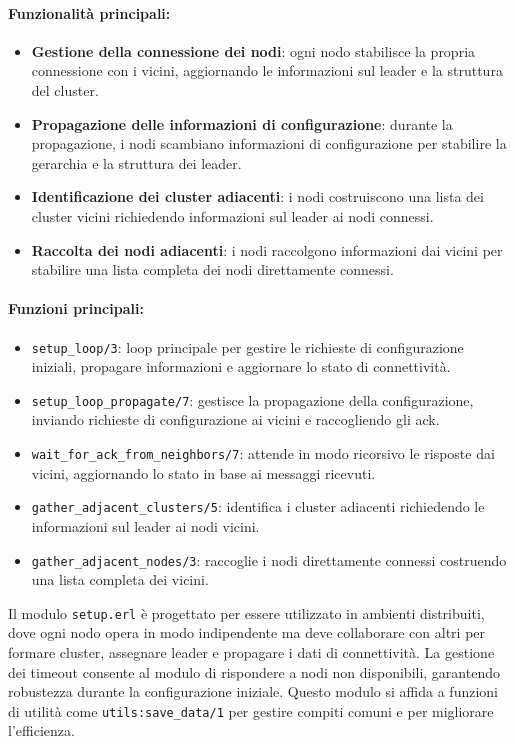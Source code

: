 \documentclass[12pt, a4paper]{report}
\begin{document}
\paragraph{Funzionalità principali:}
\begin{itemize}
    \item \textbf{Gestione della connessione dei nodi}: ogni nodo stabilisce la propria connessione con i vicini, aggiornando le informazioni sul leader e la struttura del cluster.
    \item \textbf{Propagazione delle informazioni di configurazione}: durante la propagazione, i nodi scambiano informazioni di configurazione per stabilire la gerarchia e la struttura dei leader.
    \item \textbf{Identificazione dei cluster adiacenti}: i nodi costruiscono una lista dei cluster vicini richiedendo informazioni sul leader ai nodi connessi.
    \item \textbf{Raccolta dei nodi adiacenti}: i nodi raccolgono informazioni dai vicini per stabilire una lista completa dei nodi direttamente connessi.
\end{itemize}

\paragraph{Funzioni principali:}
\begin{itemize}
    \item \texttt{setup\_loop/3}: loop principale per gestire le richieste di configurazione iniziali, propagare informazioni e aggiornare lo stato di connettività.
    \item \texttt{setup\_loop\_propagate/7}: gestisce la propagazione della configurazione, inviando richieste di configurazione ai vicini e raccogliendo gli ack.
    \item \texttt{wait\_for\_ack\_from\_neighbors/7}: attende in modo ricorsivo le risposte dai vicini, aggiornando lo stato in base ai messaggi ricevuti.
    \item \texttt{gather\_adjacent\_clusters/5}: identifica i cluster adiacenti richiedendo le informazioni sul leader ai nodi vicini.
    \item \texttt{gather\_adjacent\_nodes/3}: raccoglie i nodi direttamente connessi costruendo una lista completa dei vicini.
\end{itemize}

\noindent
Il modulo \texttt{setup.erl} è progettato per essere utilizzato in ambienti distribuiti, dove ogni nodo opera in modo indipendente ma deve collaborare con altri per formare cluster, assegnare leader e propagare i dati di connettività. La gestione dei timeout consente al modulo di rispondere a nodi non disponibili, garantendo robustezza durante la configurazione iniziale. Questo modulo si affida a funzioni di utilità come \texttt{utils:save\_data/1} per gestire compiti comuni e per migliorare l'efficienza.
\end{document}
